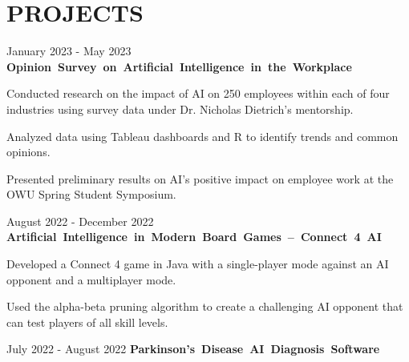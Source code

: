 \documentclass[10pt, letterpaper]{article}
\begin{document}
\section{PROJECTS}

\begin{twocolentry}{January 2023 - May 2023}
    \mbox{\textbf{Opinion Survey on Artificial Intelligence in the Workplace}}
\end{twocolentry}

\vspace{\highlightSpacing}
\begin{onecolentry}
    \begin{highlights}
        \item Conducted research on the impact of AI on 250 employees within each of four industries using survey data under Dr. Nicholas Dietrich's mentorship.
        \item Analyzed data using Tableau dashboards and R to identify trends and common opinions.
        \item Presented preliminary results on AI's positive impact on employee work at the OWU Spring Student Symposium.
    \end{highlights}
\end{onecolentry}

\vspace{\entrySpacing}\begin{twocolentry}{August 2022 - December 2022}
    \mbox{\textbf{Artificial Intelligence in Modern Board Games -- Connect 4 AI}}
\end{twocolentry}

\vspace{\highlightSpacing}
\begin{onecolentry}
    \begin{highlights}
        \item Developed a Connect 4 game in Java with a single-player mode against an AI opponent and a multiplayer mode.
        \item Used the alpha-beta pruning algorithm to create a challenging AI opponent that can test players of all skill levels.
    \end{highlights}
\end{onecolentry}

\vspace{\entrySpacing}\begin{twocolentry}{July 2022 - August 2022}
    \mbox{\textbf{Parkinson's Disease AI Diagnosis Software}}
\end{twocolentry}
\end{document}
